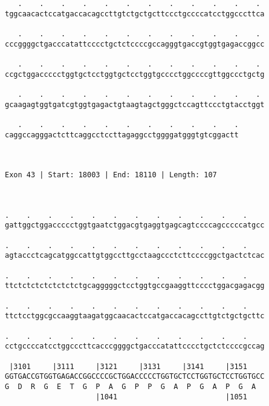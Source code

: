 \documentclass{article}
\begin{document}
\begin{Verbatim}
   .    .    .    .    .    .    .    .    .    .    .    . 
tggcaacactccatgaccacagccttgtctgctgcttccctgccccatcctggcccttca
                                                            
   .    .    .    .    .    .    .    .    .    .    .    . 
cccggggctgacccatattcccctgctctccccgccagggtgaccgtggtgagaccggcc
                                                            
   .    .    .    .    .    .    .    .    .    .    .    . 
ccgctggaccccctggtgctcctggtgctcctggtgcccctggccccgttggccctgctg
                                                            
   .    .    .    .    .    .    .    .    .    .    .    . 
gcaagagtggtgatcgtggtgagactgtaagtagctgggctccagttccctgtacctggt
                                                            
   .    .    .    .    .    .    .    .    .    .    .
caggccagggactcttcaggcctccttagaggcctggggatgggtgtcggactt
                                                      
                                                      
 
Exon 43 | Start: 18003 | End: 18110 | Length: 107



.    .    .    .    .    .    .    .    .    .    .    .    
gattggctggaccccctggtgaatctggacgtgaggtgagcagtccccagcccccatgcc
                                                            
.    .    .    .    .    .    .    .    .    .    .    .    
agtaccctcagcatggccattgtggccttgcctaagccctcttccccggctgactctcac
                                                            
.    .    .    .    .    .    .    .    .    .    .    .    
ttctctctctctctctctgcagggggctcctggtgccgaaggttcccctggacgagacgg
                                                            
.    .    .    .    .    .    .    .    .    .    .    .    
ttctcctggcgccaaggtaagatggcaacactccatgaccacagccttgtctgctgcttc
                                                            
.    .    .    .    .    .    .    .    .    .    .    .    
cctgccccatcctggcccttcacccggggctgacccatattcccctgctctccccgccag
                                                            
 |3101     |3111     |3121     |3131     |3141     |3151    
GGTGACCGTGGTGAGACCGGCCCCGCTGGACCCCCTGGTGCTCCTGGTGCTCCTGGTGCC
G  D  R  G  E  T  G  P  A  G  P  P  G  A  P  G  A  P  G  A  
                     |1041                         |1051    
  

\end{Verbatim}
\end{document}
